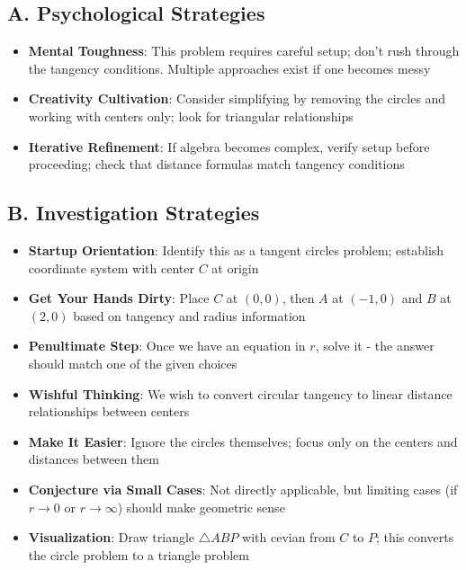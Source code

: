 \documentclass[]{article}
\begin{document}
\begin{strategicbox}
\subsection*{A. Psychological Strategies}
\begin{itemize}[leftmargin=*]
    \item \textbf{Mental Toughness}: This problem requires careful setup; don't rush through the tangency conditions. Multiple approaches exist if one becomes messy
    \item \textbf{Creativity Cultivation}: Consider simplifying by removing the circles and working with centers only; look for triangular relationships
    \item \textbf{Iterative Refinement}: If algebra becomes complex, verify setup before proceeding; check that distance formulas match tangency conditions
\end{itemize}

\subsection*{B. Investigation Strategies}
\begin{itemize}[leftmargin=*]
    \item \textbf{Startup Orientation}: Identify this as a tangent circles problem; establish coordinate system with center $C$ at origin
    \item \textbf{Get Your Hands Dirty}: Place $C$ at $(0,0)$, then $A$ at $(-1,0)$ and $B$ at $(2,0)$ based on tangency and radius information
    \item \textbf{Penultimate Step}: Once we have an equation in $r$, solve it - the answer should match one of the given choices
    \item \textbf{Wishful Thinking}: We wish to convert circular tangency to linear distance relationships between centers
    \item \textbf{Make It Easier}: Ignore the circles themselves; focus only on the centers and distances between them
    \item \textbf{Conjecture via Small Cases}: Not directly applicable, but limiting cases (if $r \to 0$ or $r \to \infty$) should make geometric sense
    \item \textbf{Visualization}: Draw triangle $\triangle ABP$ with cevian from $C$ to $P$; this converts the circle problem to a triangle problem
\end{itemize}


\end{strategicbox}
\end{document}
